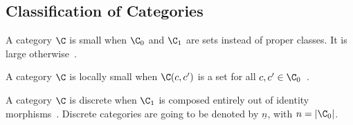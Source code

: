 \subsection{Classification of Categories}

\begin{definition}
  A category $\C$ is small when $\C_0$ and $\C_1$ are sets instead of proper
  classes. It is large otherwise~\parencite[p.~24]{awodey:category_theory}.
\end{definition}

\begin{definition}
  A category $\C$ is locally small when $\C(c, c')$ is a set for all $c,c'\in
  \C_0$~\parencite[p.~25]{awodey:category_theory}.
\end{definition}

\begin{definition}
  A category $\C$ is discrete when $\C_1$ is composed entirely out of identity
  morphisms~\parencite[p.~11]{awodey:category_theory}. Discrete categories are
  going to be denoted by $\underline{n}$, with $n=|\C_0|$.
\end{definition}